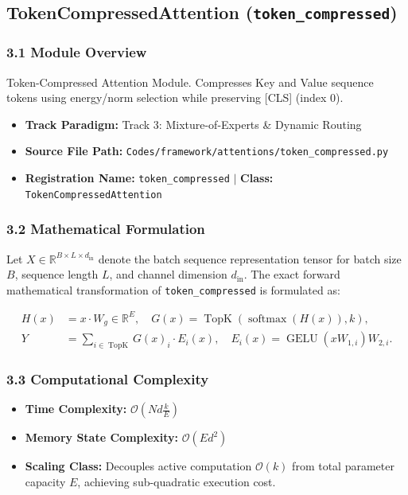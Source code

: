 \subsection{TokenCompressedAttention (\texttt{token\_compressed})}
\label{sec:app_module_token_compressed}

\subsubsection*{3.1 Module Overview}
Token-Compressed Attention Module. Compresses Key and Value sequence tokens using energy/norm selection while preserving [CLS] (index 0).
\begin{itemize}
    \item \textbf{Track Paradigm:} Track 3: Mixture-of-Experts \& Dynamic Routing
    \item \textbf{Source File Path:} \texttt{Codes/framework/attentions/token\_compressed.py}
    \item \textbf{Registration Name:} \texttt{token\_compressed} $\mid$ \textbf{Class:} \texttt{TokenCompressedAttention}
\end{itemize}

\subsubsection*{3.2 Mathematical Formulation}
Let $X \in \mathbb{R}^{B \times L \times d_{\text{in}}}$ denote the batch sequence representation tensor for batch size $B$, sequence length $L$, and channel dimension $d_{\text{in}}$. The exact forward mathematical transformation of \texttt{token\_compressed} is formulated as:

\begin{align}
H(x) &= x \cdot W_g \in \mathbb{R}^{E}, \quad G(x) = \operatorname{TopK}\left(\operatorname{softmax}(H(x)), k\right), \\
Y &= \sum_{i \in \operatorname{TopK}} G(x)_i \cdot E_i(x), \quad E_i(x) = \operatorname{GELU}(x W_{1, i}) W_{2, i}.
\end{align}


\subsubsection*{3.3 Computational Complexity}
\begin{itemize}
    \item \textbf{Time Complexity:} $\mathcal{O}(N d \frac{k}{E})$
    \item \textbf{Memory State Complexity:} $\mathcal{O}(E d^2)$
    \item \textbf{Scaling Class:} Decouples active computation $\mathcal{O}(k)$ from total parameter capacity $E$, achieving sub-quadratic execution cost.
\end{itemize}

